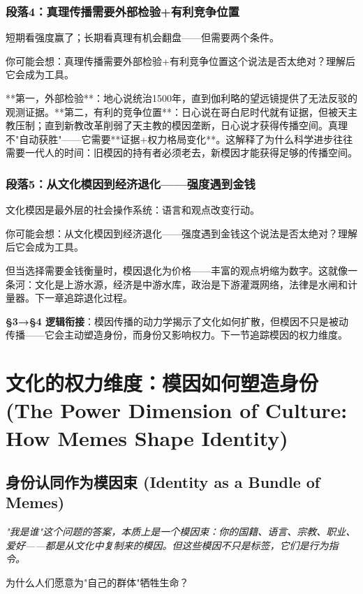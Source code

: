 \documentclass[a4paper,12pt]{book}
\newenvironment{motivation}{\begin{tcolorbox}[colback=gray!10,colframe=gray!60,title=\textit{动机}]\small\itshape}{\end{tcolorbox}}
\newenvironment{questionbox}{\begin{tcolorbox}[colback=red!3,colframe=red!60]}{\end{tcolorbox}}
\begin{document}
\begin{motivation}
\begin{motivation}
\begin{motivation}
	\subsubsection*{段落4：真理传播需要外部检验+有利竞争位置}
	短期看强度赢了；长期看真理有机会翻盘——但需要两个条件。
	\begin{tcolorbox}[colback=yellow!5, title=\textit{读者行为预测}]
		你可能会想：真理传播需要外部检验+有利竞争位置这个说法是否太绝对？理解后它会成为工具。
	\end{tcolorbox}

**第一，外部检验**：地心说统治1500年，直到伽利略的望远镜提供了无法反驳的观测证据。**第二，有利的竞争位置**：日心说在哥白尼时代就有证据，但被天主教压制；直到新教改革削弱了天主教的模因垄断，日心说才获得传播空间。真理不"自动获胜"——它需要**证据+权力格局变化**。这解释了为什么科学进步往往需要一代人的时间：旧模因的持有者必须老去，新模因才能获得足够的传播空间。

	\subsubsection*{段落5：从文化模因到经济退化——强度遇到金钱}
	文化模因是最外层的社会操作系统：语言和观点改变行动。
	\begin{tcolorbox}[colback=yellow!5, title=\textit{读者行为预测}]
		你可能会想：从文化模因到经济退化——强度遇到金钱这个说法是否太绝对？理解后它会成为工具。
	\end{tcolorbox}

但当选择需要金钱衡量时，模因退化为价格——丰富的观点坍缩为数字。这就像一条河：文化是上游水源，经济是中游水库，政治是下游灌溉网络，法律是水闸和计量器。下一章追踪退化过程。

	\textbf{§3→§4 逻辑衔接}：模因传播的动力学揭示了文化如何扩散，但模因不只是被动传播——它会主动塑造身份，而身份又影响权力。下一节追踪模因的权力维度。


	
	\section{文化的权力维度：模因如何塑造身份 (The Power Dimension of Culture: How Memes Shape Identity)}

	\subsection{身份认同作为模因束 (Identity as a Bundle of Memes)}
	\begin{motivation}
		"我是谁"这个问题的答案，本质上是一个模因束：你的国籍、语言、宗教、职业、爱好——都是从文化中复制来的模因。但这些模因不只是标签，它们是行为指令。
	\end{motivation}
	\begin{questionbox}
		为什么人们愿意为"自己的群体"牺牲生命？
	\end{questionbox}


\end{motivation}
\end{motivation}
\end{motivation}
\end{document}
